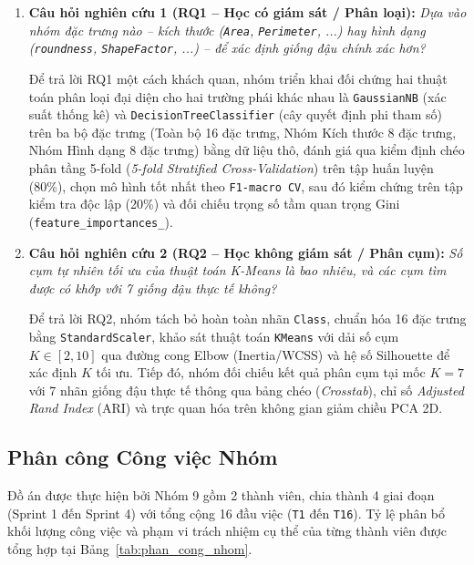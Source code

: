 \documentclass[a4paper,12pt]{report}
\begin{document}
\begin{enumerate}[leftmargin=*]
    \item \textbf{Câu hỏi nghiên cứu 1 (RQ1 -- Học có giám sát / Phân loại):} \textit{Dựa vào nhóm đặc trưng nào -- kích thước (\texttt{Area}, \texttt{Perimeter}, ...) hay hình dạng (\texttt{roundness}, \texttt{ShapeFactor}, ...) -- để xác định giống đậu chính xác hơn?}
    
    Để trả lời RQ1 một cách khách quan, nhóm triển khai đối chứng hai thuật toán phân loại đại diện cho hai trường phái khác nhau là \texttt{GaussianNB} (xác suất thống kê) và \texttt{DecisionTreeClassifier} (cây quyết định phi tham số) trên ba bộ đặc trưng (Toàn bộ 16 đặc trưng, Nhóm Kích thước 8 đặc trưng, Nhóm Hình dạng 8 đặc trưng) bằng dữ liệu thô, đánh giá qua kiểm định chéo phân tầng 5-fold (\textit{5-fold Stratified Cross-Validation}) trên tập huấn luyện (80\%), chọn mô hình tốt nhất theo \texttt{F1-macro CV}, sau đó kiểm chứng trên tập kiểm tra độc lập (20\%) và đối chiếu trọng số tầm quan trọng Gini (\texttt{feature\_importances\_}).
    
    \item \textbf{Câu hỏi nghiên cứu 2 (RQ2 -- Học không giám sát / Phân cụm):} \textit{Số cụm tự nhiên tối ưu của thuật toán K-Means là bao nhiêu, và các cụm tìm được có khớp với 7 giống đậu thực tế không?}
    
    Để trả lời RQ2, nhóm tách bỏ hoàn toàn nhãn \texttt{Class}, chuẩn hóa 16 đặc trưng bằng \texttt{StandardScaler}, khảo sát thuật toán \texttt{KMeans} với dải số cụm $K \in [2, 10]$ qua đường cong Elbow (Inertia/WCSS) và hệ số Silhouette để xác định $K$ tối ưu. Tiếp đó, nhóm đối chiếu kết quả phân cụm tại mốc $K = 7$ với 7 nhãn giống đậu thực tế thông qua bảng chéo (\textit{Crosstab}), chỉ số \textit{Adjusted Rand Index} (ARI) và trực quan hóa trên không gian giảm chiều PCA 2D.
\end{enumerate}

\subsection{Phân công Công việc Nhóm}
Đồ án được thực hiện bởi Nhóm 9 gồm 2 thành viên, chia thành 4 giai đoạn (Sprint 1 đến Sprint 4) với tổng cộng 16 đầu việc (\texttt{T1} đến \texttt{T16}). Tỷ lệ phân bổ khối lượng công việc và phạm vi trách nhiệm cụ thể của từng thành viên được tổng hợp tại Bảng~\ref{tab:phan_cong_nhom}.
\end{document}
